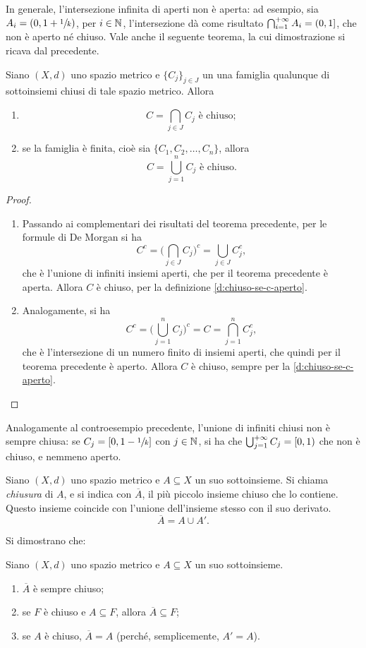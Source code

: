 In generale, l'intersezione infinita di aperti non è aperta: ad esempio, sia $A_i=(0,1+\sfrac{1}{k})$, per $i\in\mathbb{N}$, l'intersezione dà come risultato $\bigcap_{i=1}^{+\infty}A_i=(0,1]$, che non è aperto né chiuso.
Vale anche il seguente teorema, la cui dimostrazione si ricava dal precedente.
\begin{teorema}
Siano $(X,d)$ uno spazio metrico e $\{C_j\}_{j\in J}$ un una famiglia qualunque di sottoinsiemi chiusi di tale spazio metrico. Allora
\begin{enumerate}
\item\[
C=\bigcap_{j\in J} C_j\text{ è chiuso};
\]
\item se la famiglia è finita, cioè sia $\{C_1,C_2,\dots,C_n\}$, allora
\[
C=\bigcup_{j=1}^n C_j\text{ è chiuso}.
\]
\end{enumerate}
\end{teorema}
\begin{proof}
\begin{enumerate}
\item Passando ai complementari dei risultati del teorema precedente, per le formule di De Morgan si ha
\[
C^c=\bigg(\bigcap_{j\in J} C_j\bigg)^c=\bigcup_{j\in J} C^c_j,
\]
che è l'unione di infiniti insiemi aperti, che per il teorema precedente è aperta. Allora $C$ è chiuso, per la definizione \ref{d:chiuso-se-c-aperto}.
\item Analogamente, si ha
\[
C^c=\bigg(\bigcup_{j=1}^n C_j\bigg)^c=C=\bigcap_{j=1}^n C^c_j,
\]
che è l'intersezione di un numero finito di insiemi aperti, che quindi per il teorema precedente è aperto. Allora $C$ è chiuso, sempre per la \ref{d:chiuso-se-c-aperto}.\qedhere
\end{enumerate}
\end{proof}
Analogamente al controesempio precedente, l'unione di infiniti chiusi non è sempre chiusa: se $C_j=[0,1-\sfrac{1}{k}]$ con $j\in\mathbb{N}$, si ha che $\bigcup_{j=1}^{+\infty}C_j=[0,1)$ che non è chiuso, e nemmeno aperto.
\begin{definizione}
Siano $(X,d)$ uno spazio metrico e $A\subseteq X$ un suo sottoinsieme. Si chiama \emph{chiusura} di $A$, e si indica con $\overline{A}$, il più piccolo insieme chiuso che lo contiene. Questo insieme coincide con l'unione dell'insieme stesso con il suo derivato.
\[
\overline{A}=A\cup A'.
\]
\end{definizione}
Si dimostrano che:
\begin{teorema}
Siano $(X,d)$ uno spazio metrico e $A\subseteq X$ un suo sottoinsieme. 
\begin{enumerate}
\item $\overline{A}$ è sempre chiuso;
\item se $F$ è chiuso e $A\subseteq F$, allora $\overline{A}\subseteq F$;
\item se $A$ è chiuso, $\overline{A}=A$ (perché, semplicemente, $A'=A$).
\end{enumerate}
\end{teorema}
